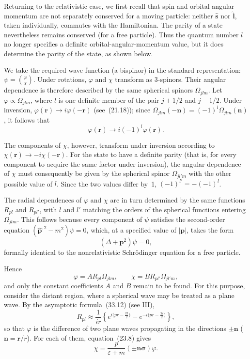 Returning to the relativistic case, we first recall that spin and orbital angular momentum are not separately conserved for a moving particle: neither $\widehat{\mathbf{s}}$ nor $\widehat{\mathbf{l}}$, taken individually, commutes with the Hamiltonian. The parity of a state nevertheless remains conserved (for a free particle). Thus the quantum number $l$ no longer specifies a definite orbital-angular-momentum value, but it does determine the parity of the state, as shown below.

We take the required wave function (a bispinor) in the standard representation: $\psi = \binom{\varphi}{\chi}$. Under rotations, $\varphi$ and $\chi$ transform as 3-spinors. Their angular dependence is therefore described by the same spherical spinors $\Omega_{jlm}$. Let $\varphi \propto \Omega_{jlm}$, where $l$ is one definite member of the pair $j + 1/2$ and $j - 1/2$. Under inversion, $\varphi(\mathbf{r}) \to i\varphi(-\mathbf{r})$ (see~(21.18)); since $\Omega_{jlm}(-\mathbf{n}) = (-1)^l\Omega_{jlm}(\mathbf{n})$, it follows that
\[
\varphi(\mathbf{r}) \to i(-1)^l\varphi(\mathbf{r}).
\]

The components of $\chi$, however, transform under inversion according to $\chi(\mathbf{r}) \to -i\chi(-\mathbf{r})$. For the state to have a definite parity (that is, for every component to acquire the same factor under inversion), the angular dependence of $\chi$ must consequently be given by the spherical spinor $\Omega_{jl'm}$ with the other possible value of $l$. Since the two values differ by~1, $(-1)^{l'} = -(-1)^l$.

The radial dependences of $\varphi$ and $\chi$ are in turn determined by the same functions $R_{pl}$ and $R_{pl'}$, with $l$ and $l'$ matching the orders of the spherical functions entering $\Omega_{jlm}$. This follows because every component of $\psi$ satisfies the second-order equation $(\widehat{\mathbf p}^{,2} - m^2)\psi = 0$, which, at a specified value of $|\mathbf{p}|$, takes the form
\[
(\Delta + \mathbf{p}^2)\psi = 0,
\]
formally identical to the nonrelativistic Schr\"odinger equation for a free particle.

Hence
\begin{equation}
\varphi = AR_{pl}\Omega_{jlm},\qquad \chi = BR_{pl'}\Omega_{jl'm},
\tag{24.6}
\end{equation}
and only the constant coefficients $A$ and $B$ remain to be found. For this purpose, consider the distant region, where a spherical wave may be treated as a plane wave. By the asymptotic formula~(33.12) (see III),
\begin{equation}
R_{pl} \approx \frac{1}{ir}\left\{e^{i\bigl(pr - \frac{\pi l}{2}\bigr)} - e^{-i\bigl(pr - \frac{\pi l}{2}\bigr)}\right\},
\tag{24.7}
\end{equation}
so that $\varphi$ is the difference of two plane waves propagating in the directions $\pm\mathbf{n}$ ($\mathbf{n} = \mathbf{r}/r$). For each of them, equation~(23.8) gives
\[
\chi = \frac{p}{\varepsilon + m}(\pm\mathbf{n}\boldsymbol{\sigma})\varphi.
\]

